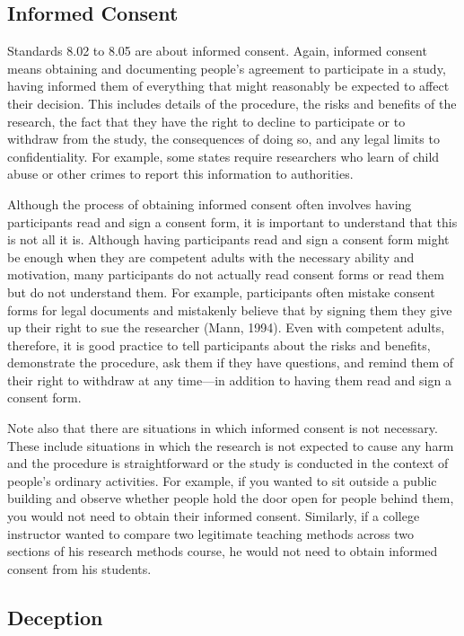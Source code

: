 \subsection{Informed Consent}


Standards 8.02 to 8.05 are about informed consent. Again, informed consent means obtaining and documenting
people's agreement to participate in a study, having informed them of everything that might reasonably be expected to affect their decision. This includes details of the procedure, the risks and benefits of the research, the fact that they have the right to decline to participate or to withdraw from the study, the consequences of doing so, and any
legal limits to confidentiality. For example, some states require researchers who learn of child abuse or other crimes to report this information to authorities.


Although the process of obtaining informed consent often involves having participants read and sign a consent form, it is important to understand that this is not all it is. Although having participants read and sign a consent form might be enough when they are competent adults with the necessary ability and motivation, many participants do not actually read consent forms or read them but do not understand them. For example, participants often mistake consent forms for legal documents and mistakenly believe that by signing them they give up their right to sue the researcher (Mann, 1994). Even with competent adults, therefore, it is good practice to tell participants about the risks and benefits, demonstrate the procedure, ask them if they have questions, and remind them of their right to withdraw at any time---in addition to having them read and sign a consent form.


Note also that there are situations in which informed consent is not necessary. These include situations in which the research is not expected to cause any harm and the procedure is straightforward or the study is conducted in the context of people's ordinary activities. For example, if you wanted to sit outside a public building and observe whether people hold the door open for people behind them, you would not need to obtain their informed consent. Similarly, if a college instructor wanted to compare two legitimate teaching methods across two sections of his research methods course, he would not need to obtain informed consent from his students.


\subsection{Deception}


